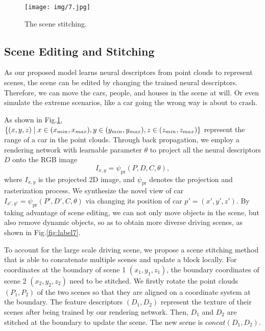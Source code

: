 \documentclass[sigconf]{acmart}
\begin{document}
\begin{figure}[h]
\setlength{\abovecaptionskip}{-0.1cm} 
\setlength{\belowcaptionskip}{0pt}
  \centering
  \texttt{[image: img/7.jpg]}
  \caption{The scene stitching.}
    \label{fig:label5}
    \vspace{-0.3cm}
\end{figure}



\subsection{Scene Editing and Stitching}
As our proposed model learns neural descriptors from point clouds to represent scenes, the scene can be edited by changing the trained neural descriptors. Therefore, we can move the cars, people, and houses in the scene at will. Or even simulate the extreme scenarios, like a car going the wrong way is about to crash. 

As shown in Fig.\ref{fig:label5}, $\{(x,y,z)\mid x\in(x_{min},x_{max}), y\in(y_{min},y_{max}),\\ z\in(z_{min},z_{max})\}$ represent the range of a car in the point clouds. Through back propagation, we employ a rendering network with learnable parameter $\theta$ to project all the neural descriptors $D$ onto the RGB image
\begin{equation}
I_{x, y}=\psi_{\mathrm{pr}}\left(P, D, C, \theta\right), 
\end{equation}
where $I_{x,y}$ is the projected 2D image, and $\psi_{\mathrm{pr}}$ denotes the projection and rasterization process. We synthesize the novel view of car $I_{x', y'}=\psi_{\mathrm{pr}}\left(P', D', C, \theta\right)$ via changing its position of car $p'=(x',y',z')$. By taking advantage of scene editing, we can not only move objects in the scene, but also remove dynamic objects, so as to obtain more diverse driving scenes, as shown in Fig.\ref{fig:label7}.


To account for the large scale driving scene, we propose a scene stitching method that is able to concatenate multiple scenes and update a block locally. For coordinates at the boundary of scene 1 $(x_1,y_1,z_1)$, the boundary coordinates of scene 2 $(x_2,y_2,z_2)$ need to be stitched. We firstly rotate the point clouds $(P_{1},P_{2})$ of the two scenes so that they are aligned on a coordinate system at the boundary. The feature descriptors $(D_{1},D_{2})$ represent the texture of their scenes after being trained by our rendering network. Then, $D_{1}$ and $D_{2}$ are stitched at the boundary to update the scene. The new scene is $concat(D_{1},D_{2})$.
\end{document}
